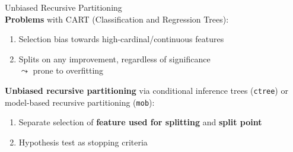 \documentclass[10pt,compress,t,notes=noshow, xcolor=table]{beamer}
\begin{document}
\begin{framev}[align=top]{Unbiased Recursive Partitioning}
\\
\textbf{Problems} with CART (Classification and Regression Trees):
\begin{enumerate}
\item Selection bias towards high-cardinal/continuous features
\item Splits on any improvement, regardless of significance\\
$\leadsto$ prone to overfitting
\end{enumerate}
\pause
\textbf{Unbiased recursive partitioning} via conditional inference trees (\texttt{ctree}) or model-based recursive partitioning (\texttt{mob}):
\begin{enumerate}
\item Separate selection of \textbf{feature used for splitting} and \textbf{split point}
\item Hypothesis test as stopping criteria
\end{enumerate}
\spacer[0.25]
\pause
{}
    

\end{framev}
\end{document}
